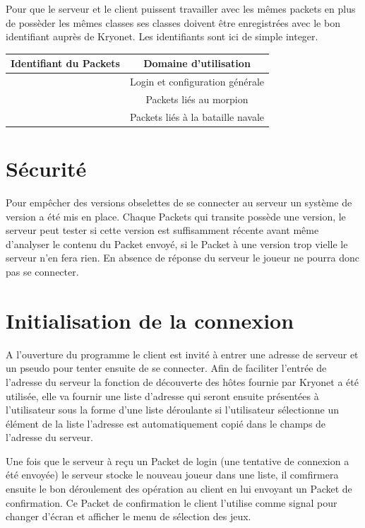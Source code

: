 \documentclass{report}
\begin{document}
Pour que le serveur et le client puissent travailler avec les mêmes packets en plus de
possèder les mêmes classes ses classes doivent être enregistrées avec le bon identifiant auprès de
Kryonet. Les identifiants sont ici de simple integer.

\begin{tabular}{|l|c|}
\hline
 Identifiant du Packets & Domaine d'utilisation \\
\hline [0-999] & Login et configuration générale \\
\hline[1000-1999] & Packets liés au morpion \\
\hline[2000-2999] & Packets liés à la bataille navale \\
\hline
\end{tabular}

\section{Sécurité}
Pour empêcher des versions obselettes de se connecter au serveur un système de version a été mis en place.
Chaque Packets qui transite possède une version, le serveur peut tester si cette version est suffisamment
récente avant même d'analyser le contenu du Packet envoyé, si le Packet à une version trop vielle le serveur n'en fera rien.
En absence de réponse du serveur le joueur ne pourra donc pas se connecter.


\section{Initialisation de la connexion}
A l'ouverture du programme le client est invité à entrer une adresse de serveur
et un pseudo pour tenter ensuite de se connecter. Afin de faciliter l'entrée de l'adresse du serveur la fonction de
découverte des hôtes fournie par Kryonet a été utilisée, elle va fournir une
liste d'adresse qui seront ensuite présentées à l'utilisateur sous la forme d'une liste déroulante
si l'utilisateur sélectionne un élément de la liste l'adresse est automatiquement copié dans le champs de l'adresse du serveur.

Une fois que le serveur à reçu un Packet de login (une tentative de connexion a
été envoyée) le serveur stocke le nouveau joueur dans une liste, il comfirmera ensuite le
bon déroulement des opération au client en lui envoyant un Packet de confirmation.
Ce Packet de confirmation le client l'utilise comme signal pour changer d'écran
et afficher le menu de sélection des jeux.
\end{document}
